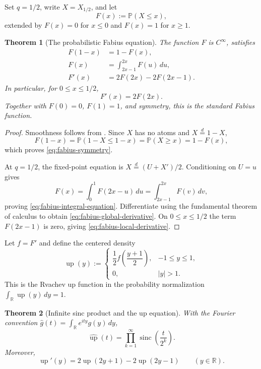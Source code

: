 \documentclass[11pt,oneside,openany]{book}
\newtheorem{theorem}{Theorem}[chapter]
\theoremstyle{definition}
\theoremstyle{remark}
\newcommand{\R}{\mathbb R}
\newcommand{\abs}[1]{\lvert #1\rvert}
\begin{document}
Set $q=1/2$, write $X=X_{1/2}$, and let
\[
 F(x):=\mathbb P(X\le x),
\]
extended by $F(x)=0$ for $x\le0$ and $F(x)=1$ for $x\ge1$.

\begin{theorem}[The probabilistic Fabius equation]\label{thm:probabilistic-fabius}
The function $F$ is $C^\infty$, satisfies
\begin{align}
 F(1-x)&=1-F(x),\label{eq:fabius-symmetry}\\
 F(x)&=\int_{2x-1}^{2x}F(u)\,du,\label{eq:fabius-integral-equation}\\
 F'(x)&=2F(2x)-2F(2x-1).\label{eq:fabius-global-derivative}
\end{align}
In particular, for $0\le x\le1/2$,
\begin{equation}\label{eq:fabius-local-derivative}
 F'(x)=2F(2x).
\end{equation}
Together with $F(0)=0$, $F(1)=1$, and symmetry, this is the standard Fabius function.
\end{theorem}

\begin{proof}
Smoothness follows from .  Since $X$ has no atoms and $X\overset d=1-X$,
\[
 F(1-x)=\mathbb P(1-X\le1-x)
 =\mathbb P(X\ge x)=1-F(x),
\]
which proves \eqref{eq:fabius-symmetry}.

At $q=1/2$, the fixed-point equation is
$X\overset d=(U+X')/2$.  Conditioning on $U=u$ gives
\[
 F(x)=\int_0^1F(2x-u)\,du
 =\int_{2x-1}^{2x}F(v)\,dv,
\]
proving \eqref{eq:fabius-integral-equation}.  Differentiate using the fundamental theorem of calculus to obtain
\eqref{eq:fabius-global-derivative}.  On $0\le x\le1/2$ the term $F(2x-1)$ is zero, giving \eqref{eq:fabius-local-derivative}.
\end{proof}

Let $f=F'$ and define the centered density
\begin{equation}\label{eq:up-definition}
 \operatorname{up}(y):=
 \begin{cases}
  \dfrac12 f\!\left(\dfrac{y+1}{2}\right),&-1\le y\le1,\\[6pt]
  0,&\abs y>1.
 \end{cases}
\end{equation}
This is the Rvachev up function in the probability normalization
$\int_{\R}\operatorname{up}(y)\,dy=1$.

\begin{theorem}[Infinite sinc product and the up equation]\label{thm:up-sinc-product}
With the Fourier convention
$\widehat g(t)=\int_{\R}e^{ity}g(y)\,dy$,
\begin{equation}\label{eq:up-sinc-product}
 \widehat{\operatorname{up}}(t)
 =\prod_{k=1}^{\infty}\operatorname{sinc}\!\left(\frac{t}{2^k}\right).
\end{equation}
Moreover,
\begin{equation}\label{eq:up-functional-differential}
 \operatorname{up}'(y)
 =2\operatorname{up}(2y+1)-2\operatorname{up}(2y-1)
 \qquad(y\in\R).
\end{equation}
\end{theorem}
\end{document}
